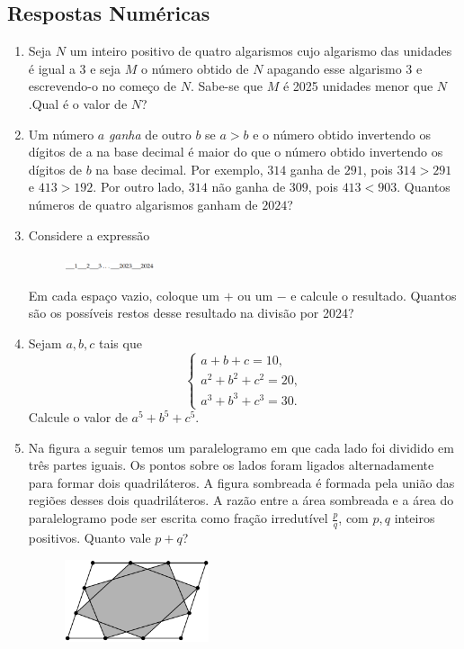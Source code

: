 \documentclass[12pt]{article}
\begin{document}
    \subsection{Respostas Numéricas}
      \begin{enumerate}[label=\textbf{\arabic*.}, start=16]
        \item Seja \(N\) um inteiro positivo de quatro algarismos cujo algarismo das unidades é igual a 3 e seja \(M\) o número obtido de
          \(N\) apagando esse algarismo 3 e escrevendo-o no começo de \(N\). Sabe-se que \(M\) é 2025 unidades menor que \(N\).Qual é o valor
          de \(N\)?
        \item Um número $a$ \textit{ganha} de outro $b$ se $a > b$ e o número obtido invertendo os dígitos de a na base decimal é
maior do que o número obtido invertendo os dígitos de $b$ na base decimal. Por exemplo, $314$ ganha de $291$,
pois $314 > 291$ e $413 > 192$. Por outro lado, $314$ não ganha de $309$, pois $413 < 903$.
Quantos números de quatro algarismos ganham de $2024$?
        \item Considere a expressão

          \begin{figure}[h]
            \centering
            \includegraphics[width=0.25\textwidth]{seventh.png}
          \end{figure}
          Em cada espaço vazio, coloque um \(+\) ou um \(-\) e calcule o resultado. Quantos são os possíveis restos desse resultado na
          divisão por 2024?
        \item Sejam \(a,b,c\) tais que
          \[
            \begin{cases}
              a+b+c=10,\\
              a^2+b^2+c^2=20,\\
              a^3+b^3+c^3=30.
            \end{cases}
          \]
          Calcule o valor de \(a^5+b^5+c^5\).
        \item Na figura a seguir temos um paralelogramo em que cada lado foi dividido em três partes iguais. Os pontos sobre os lados foram
          ligados alternadamente para formar dois quadriláteros. A figura sombreada é formada pela união das regiões desses dois quadriláteros.
          A razão entre a área sombreada e a área do paralelogramo pode ser escrita como fração irredutível \(\tfrac{p}{q}\), com \(p,q\)
          inteiros positivos. Quanto vale \(p+q\)?
          \begin{figure}[h]
            \centering
            \includegraphics[width=0.4\textwidth]{sixth.png}
          \end{figure}
      \end{enumerate}
  \clearpage
\end{document}
